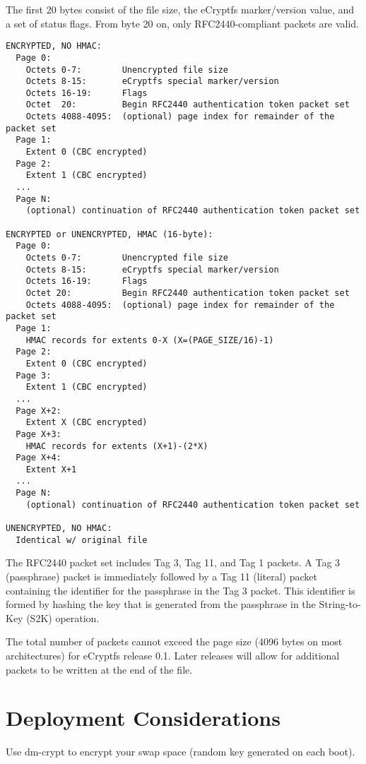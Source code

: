 \documentclass{article}
\begin{document}
The first 20 bytes consist of the file size, the eCryptfs marker/version
value, and a set of status flags. From byte 20 on, only
RFC2440-compliant packets are valid.

\scriptsize
\begin{verbatim}
ENCRYPTED, NO HMAC:
  Page 0:
    Octets 0-7:        Unencrypted file size
    Octets 8-15:       eCryptfs special marker/version
    Octets 16-19:      Flags
    Octet  20:         Begin RFC2440 authentication token packet set
    Octets 4088-4095:  (optional) page index for remainder of the packet set
  Page 1:
    Extent 0 (CBC encrypted)
  Page 2:
    Extent 1 (CBC encrypted)
  ...
  Page N:
    (optional) continuation of RFC2440 authentication token packet set

ENCRYPTED or UNENCRYPTED, HMAC (16-byte):
  Page 0:
    Octets 0-7:        Unencrypted file size
    Octets 8-15:       eCryptfs special marker/version
    Octets 16-19:      Flags
    Octet 20:          Begin RFC2440 authentication token packet set
    Octets 4088-4095:  (optional) page index for remainder of the packet set
  Page 1:
    HMAC records for extents 0-X (X=(PAGE_SIZE/16)-1)
  Page 2:
    Extent 0 (CBC encrypted)
  Page 3:
    Extent 1 (CBC encrypted)
  ...
  Page X+2:
    Extent X (CBC encrypted)
  Page X+3:
    HMAC records for extents (X+1)-(2*X)
  Page X+4:
    Extent X+1
  ...
  Page N:
    (optional) continuation of RFC2440 authentication token packet set

UNENCRYPTED, NO HMAC:
  Identical w/ original file

\end{verbatim}
\normalsize

The RFC2440 packet set includes Tag 3, Tag 11, and Tag 1 packets. A
Tag 3 (passphrase) packet is immediately followed by a Tag 11
(literal) packet containing the identifier for the passphrase in the
Tag 3 packet. This identifier is formed by hashing the key that is
generated from the passphrase in the String-to-Key (S2K) operation.

The total number of packets cannot exceed the page size (4096 bytes on
most architectures) for eCryptfs release 0.1. Later releases will
allow for additional packets to be written at the end of the file.

\section*{Deployment Considerations}

Use dm-crypt to encrypt your swap space (random key generated on each
boot).
\end{document}

